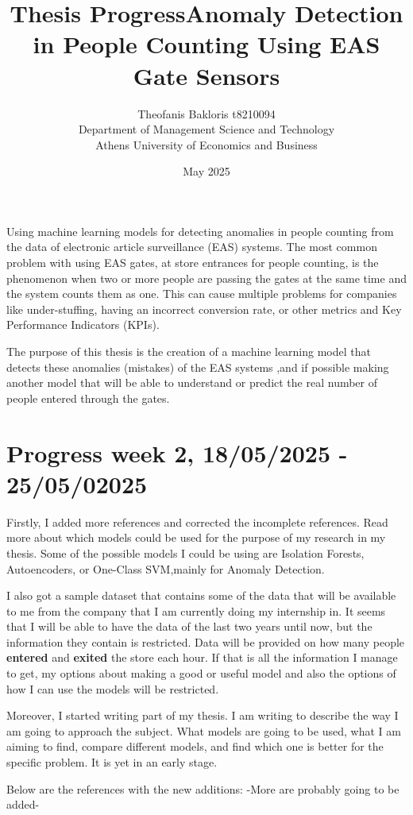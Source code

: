 \documentclass{article}
\title{\textbf{Thesis Progress}}
\author{Theofanis Bakloris t8210094\\
Department of Management Science and Technology\\
Athens University of Economics and Business}
\date{May 2025}
\begin{document}

\maketitle

\title{\textbf{Anomaly Detection in People Counting Using EAS Gate Sensors\\
}}

Using machine learning models for detecting anomalies in people counting from the data of electronic article surveillance (EAS) systems. The most common problem with using EAS gates, at store entrances for people counting, is the phenomenon when two or more people are passing the gates at the same time and the system counts them as one. This can cause multiple problems for companies like under-stuffing, having an incorrect conversion rate, or other metrics and Key Performance Indicators (KPIs).

The purpose of this thesis is the creation of a machine learning model that detects these anomalies (mistakes) of the EAS systems ,and if possible  making another model that will be able to understand or predict the real number of people entered through the gates.

\section{Progress week 2, 18/05/2025 - 25/05/02025}

Firstly, I added more references and corrected the incomplete references. Read more about which models could be used for the purpose of my research in my thesis. Some of the possible models I could be using are Isolation Forests, Autoencoders, or One-Class SVM,mainly for Anomaly Detection.

I also got a sample dataset that contains some of the data that will be available to me from the company that I am currently doing my internship in. It seems that I will be able to have the data of the last two years until now, but the information they contain is restricted. Data will be provided on how many people \textbf{entered} and \textbf{exited} the store each hour. If that is all the information I manage to get, my options about making a good or useful model and also the options of how I can use the models will be restricted.

Moreover, I started writing part of my thesis. I am writing to describe the way I am going to approach the subject. What models are going to be used, what I am aiming to find, compare different models, and find which one is better for the specific problem. It is yet in an early stage.

Below are the references with the new additions:
-More are probably going to be added-

\cite{Xie2023}
\cite{Cokbas2020}
\cite{NJANDA2024200095}
\cite{ERDEN2015127}
\cite{10.1117/1.JEI.32.4.042106}
\cite{HUSSEIN2024100169}
\cite{Langer}
\cite{choi}
\cite{choi2}
\cite{Violatto}
\cite{HERZER2003598}



\end{document}
